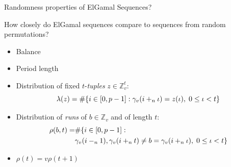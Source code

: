 \begin{frame}{Randomness properties of ElGamal Sequences?}
    
    \begin{center}
        How closely do ElGamal sequences compare to sequences from random permutations?
    \end{center}
    
    \begin{itemize}
        \item Balance
        \item Period length
        \item Distribution of fixed $t$-\emph{tuples} $z\in\mathbb{Z}_v^t$:
        $$\lambda(z) = \#{\{i \in [0,p-1]: \gamma_v(i+_{n} \iota) = z(\iota),\; 0 \leq \iota < t\}}$$
        \item  Distribution of \emph{runs} of $b\in\mathbb{Z}_v$ and of length $t$:
        \begin{align*}
            \rho(b,t) = & \#{ \{i \in [0,p-1]: }\\
                        &\gamma_v(i-_{n} 1),\gamma_v(i+_n t) \neq b = \gamma_v(i+_n\iota),\; 0 \leq \iota < t\}
        \end{align*}
        \item $\rho(t) = v \rho(t+1)$
    \end{itemize}
  
  \end{frame}



